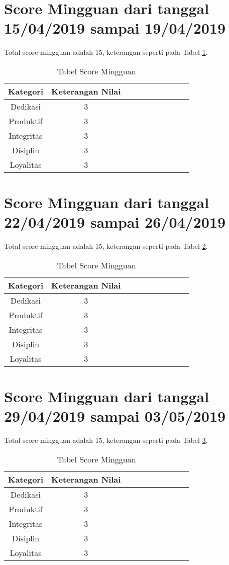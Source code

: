 \section{Score Mingguan dari tanggal 15/04/2019 sampai 19/04/2019}
Total score mingguan adalah 15,  keterangan seperti pada Tabel \ref{table:scoremingguan8}.
\begin{table}[!ht]
\centering
\begin{tabular}{ |c|c|c|c|c|c|c|c|c|c| }
\hline
Kategori & Keterangan Nilai \\
\hline
Dedikasi & 3 \\
\hline
Produktif & 3 \\
\hline
Integritas & 3 \\
\hline
Disiplin & 3 \\
\hline
Loyalitas & 3 \\
\hline
\end{tabular}
\caption{Tabel Score Mingguan}
\label{table:scoremingguan8}
\end{table}


\section{Score Mingguan dari tanggal 22/04/2019 sampai 26/04/2019}
Total score mingguan adalah 15,  keterangan seperti pada Tabel \ref{table:scoremingguan9}.
\begin{table}[!ht]
\centering
\begin{tabular}{ |c|c|c|c|c|c|c|c|c|c| }
\hline
Kategori & Keterangan Nilai \\
\hline
Dedikasi & 3 \\
\hline
Produktif & 3 \\
\hline
Integritas & 3 \\
\hline
Disiplin & 3 \\
\hline
Loyalitas & 3 \\
\hline
\end{tabular}
\caption{Tabel Score Mingguan}
\label{table:scoremingguan9}
\end{table}




\section{Score Mingguan dari tanggal 29/04/2019 sampai 03/05/2019}
Total score mingguan adalah 15,  keterangan seperti pada Tabel \ref{table:scoremingguan10}.
\begin{table}[!ht]
\centering
\begin{tabular}{ |c|c|c|c|c|c|c|c|c|c| }
\hline
Kategori & Keterangan Nilai \\
\hline
Dedikasi & 3 \\
\hline
Produktif & 3 \\
\hline
Integritas & 3 \\
\hline
Disiplin & 3 \\
\hline
Loyalitas & 3 \\
\hline
\end{tabular}
\caption{Tabel Score Mingguan}
\label{table:scoremingguan10}
\end{table}


